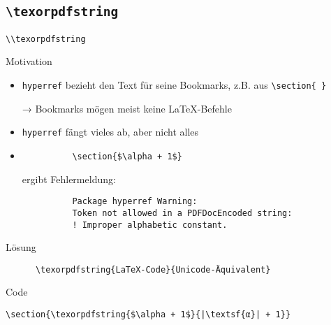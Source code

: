 \subsection{\texttt{\textbackslash texorpdfstring}}

\begin{frame}[fragile]{\lstinline+\\texorpdfstring+}
  \begin{block}{Motivation}
    \begin{itemize}
      \item \texttt{hyperref} bezieht den Text für seine Bookmarks, z.B. aus \lstinline+\section{ }+
      \item[→] Bookmarks mögen meist keine \LaTeX-Befehle
      \item \texttt{hyperref} fängt vieles ab, aber nicht alles
      \item
        \begin{lstlisting}
          \section{$\alpha + 1$}
        \end{lstlisting}
        ergibt Fehlermeldung:
        \begin{lstlisting}
          Package hyperref Warning:
          Token not allowed in a PDFDocEncoded string:
          ! Improper alphabetic constant.
        \end{lstlisting}
    \end{itemize}
  \end{block}
  \begin{block}{Lösung}
    \begin{lstlisting}
      \texorpdfstring{LaTeX-Code}{Unicode-Äquivalent}
    \end{lstlisting}
  \end{block}
  \begin{block}{Code}
    \begin{lstlisting}[escapechar=|]
      \section{\texorpdfstring{$\alpha + 1$}{|\textsf{α}| + 1}}
    \end{lstlisting}
  \end{block}
\end{frame}
